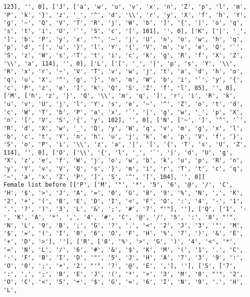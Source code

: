 \documentclass{article}
\begin{document}
\begin{verbatim}
123], '', 0], ['J', ['a', 'w', 'u', 'v', 'x', 'n', 'Z', 'p', 'l', 'm', 'P', 'k', '}', 'z', '_', '^', 'd', '\\', 'r', 'y', 'X', 'f', 'h', 'Y', 'g', '~', 'Q', 'V', 'T', 'R', 'j', 'W', 'b', ']', '{', '|', 'o', 'q', 's', 't', 'i', 'U', '`', 'S', 'c', '[', 101], '', 0], ['K', ['|', '_', ']', 'b', 'P', 'y', 'x', '^', '~', 'j', 'U', 'n', 'o', 'w', 'h', 'q', 'p', 'd', '[', 'u', '}', 'l', 'Y', '{', 'V', 'm', 'v', 'e', 'Q', '`', 'S', 'z', 'W', 's', 'T', 't', 'i', 'c', 'k', 'g', 'R', 'f', 'X', 'Z', '\\', 'a', 114], '', 0], ['L', ['[', '_', '|', 'p', 's', 'Y', '\\', 'R', 'x', 'r', '~', 'V', 'T', 'v', 'w', 'j', 't', 'a', 'd', 'h', 'o', 'q', 'u', 'X', '^', 'g', '}', 'n', 'm', 'W', 'b', 'i', '`', 'y', '{', 'c', 'P', 'z', 'e', ']', 'k', 'Q', 'S', 'Z', 'f', 'l', 85], '', 0], ['M', ['h', 'z', '}', 'Q', '\\', 'm', 'q', ']', 'r', 'i', 'R', 'k', 'u', 'v', 'U', 'j', 'l', 'Y', 's', 'e', '~', '^', 'Z', 'o', 't', 'd', 'c', 'W', 'T', 'b', 'P', 'a', 'x', '`', '|', 'g', 'w', '_', 'p', 'X', 'n', '[', 'V', 'S', '{', 'y', 102], '', 0], ['N', ['~', ']', '^', '`', 'R', 'd', 'X', 'w', '_', 'Q', 'y', 'W', 'q', 'v', 'm', 'g', 'x', 'l', 'b', 'c', 't', 'Y', 'n', 'h', 'u', 'j', 'k', 'e', 'p', 'V', 'f', '}', 'S', 'o', 'P', 'i', '\\', 'z', 'a', '|', '[', '{', 'T', 's', 'U', 'Z', 114], '', 0], ['O', ['\\', '{', 'l', '_', '`', '|', 'd', 'U', 'g', 'X', 'z', 'e', 'f', 'W', 'j', 'o', 'w', 'b', 'k', 'u', 'p', 'R', 'n', 'y', 'Y', 'v', 'V', 'Q', 's', '}', 'm', 'i', 'r', 'T', 't', 'c', 'q', '~', 'a', 'x', 'Z', 'P', ']', 'S', '^', '[', 104], '', 0]]
Female list before [['P', ['M', '"', '*', '5', '6', '@', '/', 'C', 'H', '$', '>', 'J', 'A', '=', '0', 'G', '8', '9', '%', 'N', ',', 'K', '2', '+', '(', 'B', 'E', 'D', 'I', '<', 'F', 'O', ':', '4', '-', '1', '.', '?', ')', '3', 'L', '&', ';', '#', '7', "'"], ''], ['Q', ['1', '-', 'K', 'A', '*', ',', '4', '#', 'C', '@', '/', '5', ':', '8', "'", 'N', 'L', '9', 'B', ';', 'G', '?', '.', '<', '2', 'J', '3', '"', 'M', '$', '=', '(', 'I', '0', '6', 'O', 'F', 'H', '%', '7', ')', '&', 'E', '+', 'D', '>'], ''], ['R', ['8', '%', '>', 'G', ')', '4', '<', '*', '=', 'N', 'L', '/', '6', '#', '&', '$', 'K', 'M', '(', '1', '.', 'C', '-', 'F', 'B', 'I', 'D', '"', '5', 'J', 'H', 'A', '7', '3', '9', ':', 'O', '0', ';', '+', '2', "'", '?', '@', 'E', ','], ''], ['S', ['7', ':', ',', ';', 'B', 'E', 'J', '(', '*', '>', '3', 'M', '8', "'", '2', 'O', 'C', '<', '5', '+', '$', 'G', '=', '6', 'I', 'N', '9', '.', 'H', 'L', 

\end{verbatim}
\end{document}
